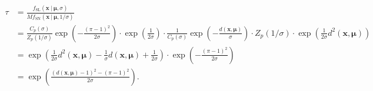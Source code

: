 \documentclass[10pt]{article}
\newcommand{\bfx}{\mathbf{x}}
\newcommand{\bfmu}{\boldsymbol{\mu}}
\newcommand{\fSN}{f_{\textrm{SN}}}
\newcommand{\fSL}{f_{\textrm{SL}}}
\begin{document}
\begin{align*}
\tau &= \frac{\fSL(\bfx~|~\bfmu,\sigma)}{M \fSN(\bfx~|~\bfmu,1/\sigma)}\\
&= \frac{C_p(\sigma)}{Z_p (1/\sigma)} 
\exp\left(-\frac{(\pi-1)^2}{2\sigma}\right) \cdot  \exp\left(\frac{1}{2\sigma}\right)\cdot 
\frac{1}{C_p(\sigma)} \exp\left(-\frac{d(\bfx,\bfmu)}{\sigma}\right) \cdot  Z_p (1/\sigma) \cdot  \exp\left(\frac{1}{2\sigma} d^2 (\bfx,\bfmu) \right)\\
&= \exp\left(\frac{1}{2\sigma}d^2 (\bfx,\bfmu) - \frac{1}{\sigma}d (\bfx,\bfmu) + \frac{1}{2\sigma}\right)\cdot \exp\left(-\frac{(\pi-1)^2}{2\sigma}\right)\\ &= \exp\left(\frac{(d(\bfx,\bfmu)-1)^2 - (\pi-1)^2}{2\sigma} \right).
\end{align*}




%


\newpage
\end{document}
